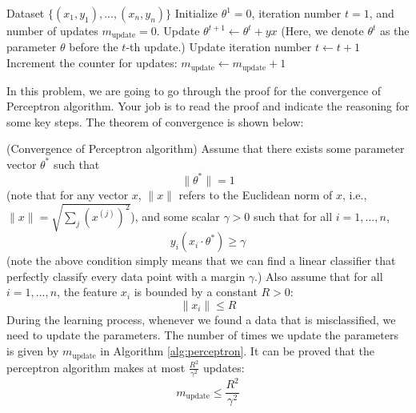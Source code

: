 \documentclass[12pt]{article}
\begin{document}
\begin{algorithm}
\begin{algorithmic}[1]
\caption{Perceptron algorithm }
\REQUIRE Dataset $\{(x_{1},y_1),...,(x_n,y_n)\}$
\STATE Initialize $\theta^1 = 0$, iteration number $t=1$, and number of updates $m_\mathrm{update}=0$.
    \STATE Update $\theta^{t+1} \leftarrow \theta^{t}+yx$ (Here, we denote $\theta^{t}$ as the parameter $\theta$ before the $t$-th update.)
    \STATE Update iteration number $t\leftarrow t+1$
    \STATE Increment the counter for updates: $m_\mathrm{update}\leftarrow m_\mathrm{update}+1$
\ENDWHILE
\end{algorithmic}
\label{alg:perceptron}
\end{algorithm}

In this problem, we are going to go through the proof for the convergence of Perceptron algorithm. Your job is to read the proof and indicate the reasoning for some key steps. The theorem of convergence is shown below:

\begin{theorem}{(Convergence of Perceptron algorithm)}
Assume that there exists some parameter vector $\theta^*$ such that \begin{equation}
    \|\theta^*\|=1
    \label{equ:ass1}
\end{equation} (note that for any vector $x$, $\|x\|$ refers to the Euclidean norm of $x$, i.e., $\|x\|=\sqrt{\sum_j (x^{(j)})^2}$), and some scalar $\gamma>0$ such that for all $i=1,...,n$,
\begin{equation}
    y_i(x_i\cdot\theta^*)\geq \gamma
    \label{equ:ass2}
\end{equation}
(note the above condition simply means that we can find a linear classifier that perfectly classify every data point with a margin $\gamma$.) Also assume that for all $i=1,...,n$, the feature $x_i$ is bounded by a constant $R>0$:
\begin{equation}
    \|x_i\|\leq R
    \label{equ:ass3}
\end{equation}
During the learning process, whenever we found a data that is misclassified, we need to update the parameters. The number of times we update the parameters is given by $m_\mathrm{update}$ in Algorithm \ref{alg:perceptron}.  It can be proved that the perceptron algorithm makes at most $\frac{R^2}{\gamma^2}$ updates:
\begin{equation}
    m_\mathrm{update}\leq \frac{R^2}{\gamma^2}
\end{equation}
\end{theorem}
\end{document}
